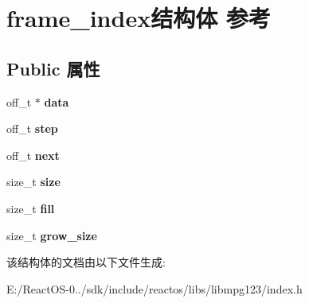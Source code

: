 \hypertarget{structframe__index}{}\section{frame\+\_\+index结构体 参考}
\label{structframe__index}
\subsection*{Public 属性}
\begin{DoxyCompactItemize}
\item 
\mbox{\label{structframe__index_ac1ee283beef8878bfe0793d25d6daa13}} 
off\+\_\+t $\ast$ {\bfseries data}
\item 
\mbox{\label{structframe__index_abec0f366c29bee1e1f2fea5985cb70ef}} 
off\+\_\+t {\bfseries step}
\item 
\mbox{\label{structframe__index_a2d920e22e61725f345460b0b9ced379d}} 
off\+\_\+t {\bfseries next}
\item 
\mbox{\label{structframe__index_ad9de6d416d8c9e8c9bc0a971c162422f}} 
size\+\_\+t {\bfseries size}
\item 
\mbox{\label{structframe__index_ab2f654037ad16d4c85f72b80ca8f5cda}} 
size\+\_\+t {\bfseries fill}
\item 
\mbox{\label{structframe__index_a46d8024b5f041e752945acbc999db865}} 
size\+\_\+t {\bfseries grow\+\_\+size}
\end{DoxyCompactItemize}


该结构体的文档由以下文件生成\+:\begin{DoxyCompactItemize}
\item 
E\+:/\+React\+O\+S-\/0../sdk/include/reactos/libs/libmpg123/index.\+h\end{DoxyCompactItemize}
